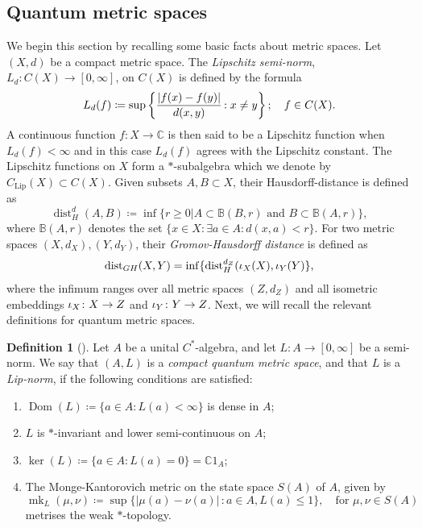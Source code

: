 \documentclass[11pt, reqno, a4paper, final]{amsart}
\theoremstyle{plain}
\theoremstyle{definition}
\newtheorem{definition}[thm]{Definition}
\newcommand{\CC}{{\mathbb C}}
\renewcommand{\leq}{\leqslant}
\renewcommand{\geq}{\geqslant}
\newcommand{\Dom}{\operatorname{Dom}}
\newcommand{\Lip}{\operatorname{Lip}}
\newcommand{\black}{\color{black}}
\begin{document}
\subsection{Quantum metric spaces}
We begin this section by recalling some basic facts about metric spaces.
Let $(X,d)$ be a compact metric space. The \emph{Lipschitz semi-norm}, $L_{d}\colon C(X)\to [0,\infty]$, on $C(X)$ is defined {\black by the formula}
 $$L_{d}(f)\coloneqq \sup \left\lbrace \frac{\vert f(x)-f(y)\vert}{d(x,y)} {\black \, : x \neq y} \right\rbrace; \quad f\in C(X).$$
{\black A continuous function $f : X \to \CC$ is then said to be a Lipschitz function when $L_d(f) < \infty$ and in this case $L_d(f)$ agrees with the Lipschitz constant. The Lipschitz functions on $X$ form a $*$-subalgebra which we denote by $C_{\Lip}(X) \subset C(X)$.} Given subsets $A,B\subset X$, their Hausdorff-distance is defined as
\[
\operatorname{dist}_H^d(A,B)\coloneqq\inf \lbrace r\geq 0 \vert A\subset \mathbb{B}(B,r) \text{ and } B\subset \mathbb{B}(A,r)\rbrace,
\]
where $\mathbb{B}(A,r)$ denotes the set $\{x\in X : \exists a\in A : d(x,a)<r\}.$
For two metric spaces $(X,d_X),(Y,d_Y)$,  their \emph{Gromov-Hausdorff distance}  is defined  as
\begin{align*}
\operatorname{dist}_{{GH}}(X,Y) = \inf\lbrace \operatorname{dist}_H^{d_Z}({\black \iota_X}(X), {\black \iota_Y}(Y) \rbrace,
\end{align*}
where the infimum ranges over all metric spaces $(Z,d_Z)$ and all isometric embeddings ${\black \iota_X}\colon X\to Z$ and ${\black \iota_Y}\colon Y\to Z$.
Next, we will recall the relevant definitions for quantum metric spaces.
\begin{definition}[\cite{Rieffel-1, Rieffel-2, Rieffel-4}]
\label{Def:QMS}
Let $A$ be a unital $C^*$-algebra, and let $ L\colon A \to [0,\infty]$ be a semi-norm. We say that $(A,L)$ is a \emph{compact quantum metric space}, and that $L$ is a \emph{Lip-norm}, if the following conditions are satisfied:
\begin{enumerate}
\item $\Dom(L)\coloneqq \lbrace a\in A : L(a)<\infty	\rbrace$ is dense in $A$;
\item $L$ is $*$-invariant and lower semi-continuous on $A$;
\item $\ker(L)\coloneqq \lbrace a\in A : L(a)=0\rbrace =\CC 1_A$;
\item The Monge-Kantorovich metric on the state space $S(A)$ of $A$, given by
$$\operatorname{mk}_L(\mu,\nu)\coloneqq \sup\lbrace \vert \mu(a)-\nu(a)\vert \, : a \in A,L(a)\leq 1 \rbrace, \quad \text{for }\mu,\nu\in S(A)$$ metrises the weak $*$-topology.
\end{enumerate}
\end{definition}
\end{document}
